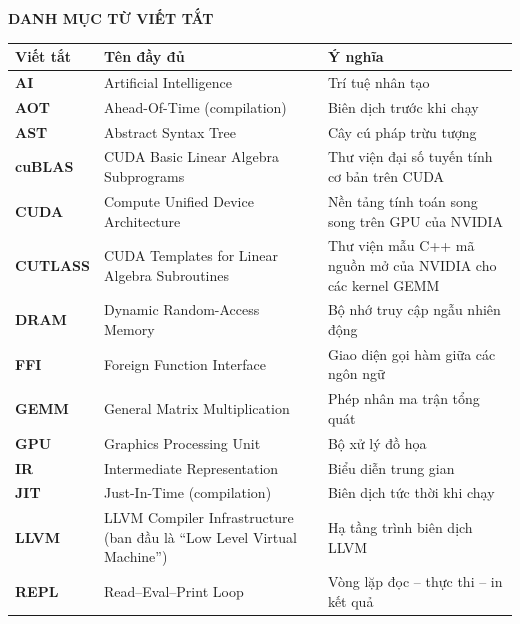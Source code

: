 \documentclass[a4paper]{article}
\begin{document}
    \vspace{10cm}
	\vspace{18pt}
	\begin{center}
		\textbf{DANH MỤC TỪ VIẾT TẮT}
	\end{center}
	\vspace{-6pt}
	\begin{center}
		\renewcommand{\arraystretch}{1.15}
		\begin{tabular}{>{\bfseries}l >{\raggedright\arraybackslash}p{5.8cm} >{\raggedright\arraybackslash}p{5.8cm}}
			\toprule
			\textbf{Viết tắt} & \textbf{Tên đầy đủ} & \textbf{Ý nghĩa} \\
			\midrule
			AI      & Artificial Intelligence & Trí tuệ nhân tạo \\
			AOT     & Ahead-Of-Time (compilation) & Biên dịch trước khi chạy \\
			AST     & Abstract Syntax Tree & Cây cú pháp trừu tượng \\
			cuBLAS  & CUDA Basic Linear Algebra Subprograms & Thư viện đại số tuyến tính cơ bản trên CUDA \\
			CUDA    & Compute Unified Device Architecture & Nền tảng tính toán song song trên GPU của NVIDIA \\
			CUTLASS & CUDA Templates for Linear Algebra Subroutines & Thư viện mẫu C++ mã nguồn mở của NVIDIA cho các kernel GEMM \\
			DRAM    & Dynamic Random-Access Memory & Bộ nhớ truy cập ngẫu nhiên động \\
			FFI     & Foreign Function Interface & Giao diện gọi hàm giữa các ngôn ngữ \\
			GEMM    & General Matrix Multiplication & Phép nhân ma trận tổng quát \\
			GPU     & Graphics Processing Unit & Bộ xử lý đồ họa \\
			IR      & Intermediate Representation & Biểu diễn trung gian \\
			JIT     & Just-In-Time (compilation) & Biên dịch tức thời khi chạy \\
			LLVM    & LLVM Compiler Infrastructure (ban đầu là ``Low Level Virtual Machine'') & Hạ tầng trình biên dịch LLVM \\
			REPL    & Read--Eval--Print Loop & Vòng lặp đọc -- thực thi -- in kết quả \\
			\bottomrule
		\end{tabular}
	\end{center}
	
	
	\newpage
	
\end{document}
